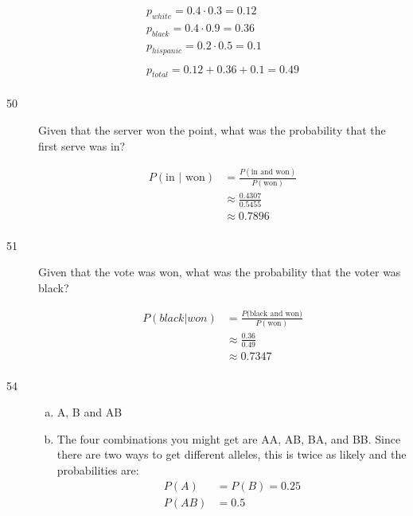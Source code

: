 \documentclass[letterpaper]{exam}
\begin{document}
\begin{description}
      \begin{align*}
        p_{white} = 0.4 \cdot 0.3 = 0.12 \\
        p_{black} = 0.4 \cdot 0.9 = 0.36 \\
        p_{hispanic} = 0.2 \cdot 0.5 = 0.1 \\
        \\
        p_{total} = 0.12 + 0.36 + 0.1 = \boxed{ 0.49 } \\
      \end{align*}

    \item[50]
      Given that the server won the point, what was the probability that the first
      serve was in?

      \begin{align*}
        P(\text{in } | \text{ won}) & = \frac{P(\text{in and won})}{P(\text{won})} \\
                    & \approx \frac{0.4307}{0.5455} \\
                    & \approx \boxed{ 0.7896 } \\
      \end{align*}

    \item[51]
      Given that the vote was won, what was the probability that the voter was black?

      \begin{align*}
        P(black | won) & = \frac{P(\text{black and won)}}{P(\text{won})} \\
                       & \approx \frac{0.36}{0.49} \\
                       & \approx \boxed{ 0.7347 } \\
      \end{align*}

    \item[54]
      \begin{enumerate}[(a)]
        \item A, B and AB

        \item
          The four combinations you might get are AA, AB, BA, and BB. Since there are 
          two ways to get different alleles, this is twice as likely and the probabilities
          are:
          \begin{align*}
            P(A)  & = P(B) = 0.25 \\
            P(AB) & = 0.5 \\
          \end{align*}
      \end{enumerate}


\end{description}
\end{document}
